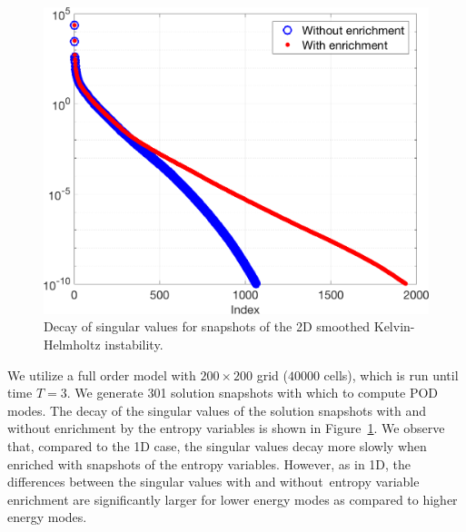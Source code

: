 \documentclass[preprint,10pt]{elsarticle}
\theoremstyle{definition}
\theoremstyle{lemma}
\theoremstyle{theorem}
\theoremstyle{assumption}
\begin{document}
\begin{figure}
\centering
\includegraphics[width=.4\textwidth]{khsvd.png}
\caption{Decay of singular values for snapshots of the 2D smoothed Kelvin-Helmholtz instability.}
\label{fig:khsvd}
\end{figure}
We utilize a full order model with $200\times 200$ grid ($40000$ cells), which is run until time $T = 3$.  We generate 301 solution snapshots with which to compute POD modes.  The decay of the singular values of the solution snapshots with and without enrichment by the entropy variables is shown in Figure~\ref{fig:khsvd}.  We observe that, compared to the 1D case, the singular values decay more slowly when enriched with snapshots of the entropy variables.  However, as in 1D, the differences between the singular values with and without entropy variable enrichment are significantly larger for lower energy modes as compared to higher energy modes.  
\end{document}
